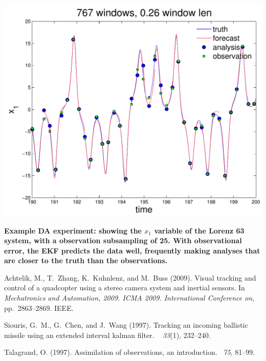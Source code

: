 \documentclass[onecolumn]{article}
\begin{document}
\begin{multicols}{2}
\clearpage
\begin{center}
	\includegraphics[scale=1.00]{DA-figure.pdf}\\
\end{center}
{\bf\small  Example DA experiment: showing the $x_1$ variable of the Lorenz 63 system, with a observation subsampling of 25. With observational error, the EKF predicts the data well, frequently making analyses that are closer to the truth than the observations.}\\
\clearpage

\begin{thebibliography}{9}

        Achtelik, M., T.~Zhang, K.~Kuhnlenz, and M.~Buss (2009).
        \newblock Visual tracking and control of a quadcopter using a stereo camera
          system and inertial sensors.
        \newblock In {\em Mechatronics and Automation, 2009. ICMA 2009. International
          Conference on}, pp.\	2863--2869. IEEE.
        
        Siouris, G.~M., G.~Chen, and J.~Wang (1997).
        \newblock Tracking an incoming ballistic missile using an extended interval
          kalman filter.
        ~{\em
          33\/}(1), 232--240.
        
        Talagrand, O. (1997).
        \newblock Assimilation of observations, an introduction.
        ~{\em 75},
          81--99.
        

\end{thebibliography}
\end{multicols}
\end{document}
